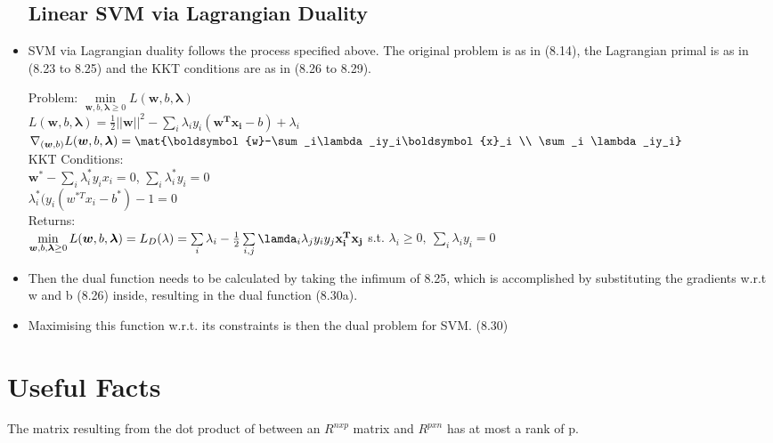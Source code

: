 \documentclass[english]{latex4ei/latex4ei_sheet}
\begin{document}
\begin{sectionbox}
\begin{itemize}
\subsection{Linear SVM via Lagrangian Duality}
\item SVM via Lagrangian duality follows the process specified above. The original problem is as in (8.14), the Lagrangian primal is as in (8.23 to 8.25) and the KKT conditions are as in (8.26 to 8.29). 
\begin{emphbox}
    Problem: $\min\limits_{\boldsymbol{w}, b, \boldsymbol{\lambda}\ge0} L(\boldsymbol{w}, b, \boldsymbol{\lambda})$ \\  $L(\boldsymbol{w}, b, \boldsymbol{\lambda})= \frac{1}{2}||\boldsymbol{w}||^2 - \sum\limits_i \lambda_i y_i(\boldsymbol{w^Tx_i}-b)+\lambda_i $\\
    		$\nabla_{(\boldsymbol{w},b)}L(\boldsymbol{w}, b, \boldsymbol{\lambda})=\mat{\boldsymbol{w}-\sum_i\lambda_iy_i\boldsymbol{x}_i \\ \sum_i \lambda_iy_i}$\\
    KKT Conditions:\\ $\mathbf{w^*}-\sum_i\lambda_i^*y_ix_i=0$, \quad $\sum_i\lambda^*_iy_i=0$\\
    $\lambda_i^*(y_i(w^{*T}x_i-b^*)-1=0$\\
    Returns: \\
    $\min\limits_{\boldsymbol{w}, b, \boldsymbol{\lambda}\ge0} L(\boldsymbol{w}, b, \boldsymbol{\lambda})=L_D(\mathbf{\lambda})=
    \sum\limits_i\lambda_i-\frac{1}{2}\sum\limits_{i,j}\lamda_i\lambda_jy_iy_j\mathbf{x_i^Tx_j}$ s.t. $\lambda_i\ge0, \ \sum_i\lambda_iy_i=0$
\end{emphbox}

\item Then the dual function needs to be calculated by taking the infimum of 8.25, which is accomplished by substituting the gradients w.r.t w and b (8.26) inside, resulting in the dual function (8.30a).
\item Maximising this function w.r.t. its constraints is then the dual problem for SVM. (8.30)
\end{itemize}

\end{sectionbox}

\section{Useful Facts}
The matrix resulting from the dot product of between an $R^{n x p}$ matrix and $R^{p x n}$ has at most a rank of p.
\end{document}
